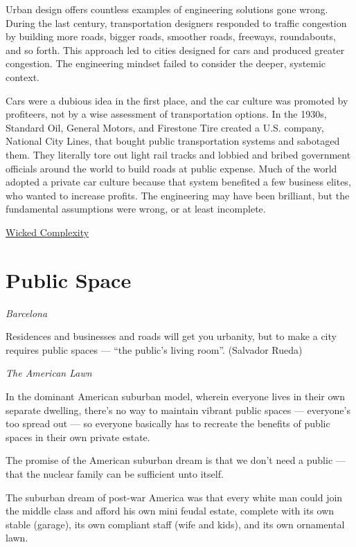 \documentclass[
]{book}
\begin{document}
Urban design offers countless examples of engineering solutions gone wrong. During the last century, transportation designers responded to traffic congestion by building more roads, bigger roads, smoother roads, freeways, roundabouts, and so forth. This approach led to cities designed for cars and produced greater congestion. The engineering mindset failed to consider the deeper, systemic context.

Cars were a dubious idea in the first place, and the car culture was promoted by profiteers, not by a wise assessment of transportation options. In the 1930s, Standard Oil, General Motors, and Firestone Tire created a U.S. company, National City Lines, that bought public transportation systems and sabotaged them. They literally tore out light rail tracks and lobbied and bribed government officials around the world to build roads at public expense. Much of the world adopted a private car culture because that system benefited a few business elites, who wanted to increase profits. The engineering may have been brilliant, but the fundamental assumptions were wrong, or at least incomplete.

\href{https://mahb.stanford.edu/blog/thresholds-cascades-and-wicked-problems/}{Wicked Complexity}

\hypertarget{public-space}{%
\section{Public Space}\label{public-space}}

\emph{Barcelona}

Residences and businesses and roads will get you urbanity,
but to make a city requires public spaces --- ``the public's living room''.
(Salvador Rueda)

\emph{The American Lawn}

In the dominant American suburban model, wherein everyone lives in their own separate dwelling, there's no way to maintain vibrant public spaces --- everyone's too spread out --- so everyone basically has to recreate the benefits of public spaces in their own private estate.

The promise of the American suburban dream is that we don't need a public --- that the nuclear family can be sufficient unto itself.

The suburban dream of post-war America was that every white man could join the middle class and afford his own mini feudal estate, complete with its own stable (garage), its own compliant staff (wife and kids), and its own ornamental lawn.
\end{document}
